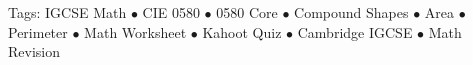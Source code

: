 \documentclass[11pt,a4paper]{article}
\begin{document}
\vspace{14pt}
\begin{center}
  \sffamily\scriptsize\textcolor{textmuted}{
    Tags: IGCSE Math $\bullet$ CIE 0580 $\bullet$ 0580 Core $\bullet$ Compound Shapes $\bullet$ Area $\bullet$ Perimeter $\bullet$ Math Worksheet $\bullet$ Kahoot Quiz $\bullet$ Cambridge IGCSE $\bullet$ Math Revision
  }
\end{center}
\end{document}
